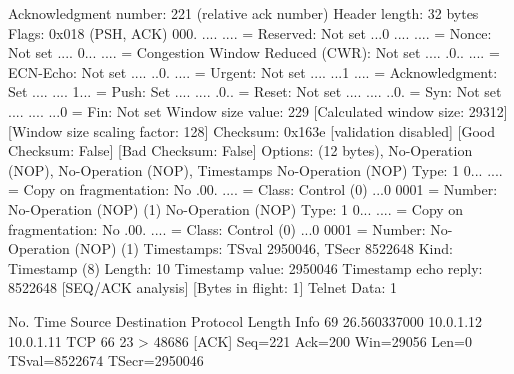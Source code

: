     Acknowledgment number: 221    (relative ack number)
    Header length: 32 bytes
    Flags: 0x018 (PSH, ACK)
        000. .... .... = Reserved: Not set
        ...0 .... .... = Nonce: Not set
        .... 0... .... = Congestion Window Reduced (CWR): Not set
        .... .0.. .... = ECN-Echo: Not set
        .... ..0. .... = Urgent: Not set
        .... ...1 .... = Acknowledgment: Set
        .... .... 1... = Push: Set
        .... .... .0.. = Reset: Not set
        .... .... ..0. = Syn: Not set
        .... .... ...0 = Fin: Not set
    Window size value: 229
    [Calculated window size: 29312]
    [Window size scaling factor: 128]
    Checksum: 0x163e [validation disabled]
        [Good Checksum: False]
        [Bad Checksum: False]
    Options: (12 bytes), No-Operation (NOP), No-Operation (NOP), Timestamps
        No-Operation (NOP)
            Type: 1
                0... .... = Copy on fragmentation: No
                .00. .... = Class: Control (0)
                ...0 0001 = Number: No-Operation (NOP) (1)
        No-Operation (NOP)
            Type: 1
                0... .... = Copy on fragmentation: No
                .00. .... = Class: Control (0)
                ...0 0001 = Number: No-Operation (NOP) (1)
        Timestamps: TSval 2950046, TSecr 8522648
            Kind: Timestamp (8)
            Length: 10
            Timestamp value: 2950046
            Timestamp echo reply: 8522648
    [SEQ/ACK analysis]
        [Bytes in flight: 1]
Telnet
    Data: 1

No.     Time           Source                Destination           Protocol Length Info
     69 26.560337000   10.0.1.12             10.0.1.11             TCP      66     23 > 48686 [ACK] Seq=221 Ack=200 Win=29056 Len=0 TSval=8522674 TSecr=2950046

